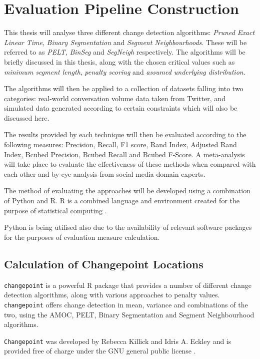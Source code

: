 \documentclass{uvamscse}	%
\begin{document}
\section{Evaluation Pipeline Construction}

This thesis will analyse three different change detection algorithms: \emph{Pruned Exact Linear Time}, \emph{Binary Segmentation} and \emph{Segment Neighbourhoods}. These will be referred to as \emph{PELT}, \emph{BinSeg} and \emph{SegNeigh} respectively. The algorithms will be briefly discussed in this thesis, along with the chosen critical values such as \emph{minimum segment length}, \emph{penalty scoring} and \emph{assumed underlying distribution}.

The algorithms will then be applied to a collection of datasets falling into two categories: real-world conversation volume data taken from Twitter, and simulated data generated according to certain constraints which will also be discussed here.

The results provided by each technique will then be evaluated according to the following measures: Precision, Recall, F1 score, Rand Index, Adjusted Rand Index, Bcubed Precision, Bcubed Recall and Bcubed F-Score. A meta-analysis will take place to evaluate the effectiveness of these methods when compared with each other and by-eye analysis from social media domain experts.

The method of evaluating the approaches will be developed using a combination of Python and \textsf{R}. \textsf{R} is a combined language and environment created for the purpose of statistical computing \cite{RCoreTeam2017}.

Python is being utilised also due to the availability of relevant software packages for the purposes of evaluation measure calculation.

\subsection{Calculation of Changepoint Locations}

\texttt{changepoint} is a powerful R package that provides a number of different change detection algorithms, along with various approaches to penalty values. \texttt{changepoint} offers change detection in mean, variance and combinations of the two, using the AMOC, PELT, Binary Segmentation and Segment Neighbourhood algorithms.

\texttt{Changepoint} was developed by Rebecca Killick and Idris A. Eckley and is provided free of charge under the GNU general public license \cite{Killick2014}.
\end{document}
